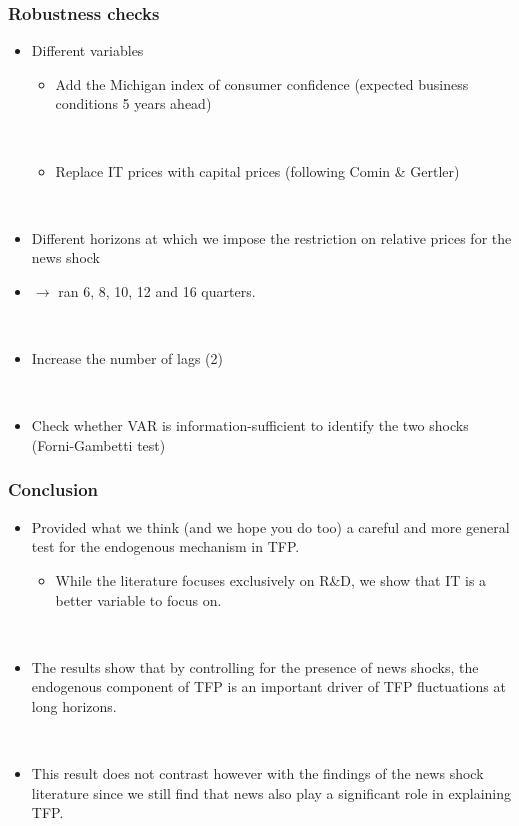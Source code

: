 \documentclass{beamer}
\begin{document}
\begin{frame}
	\frametitle{Robustness checks}

\begin{itemize}
\item Different variables
	\begin{itemize}
	\item Add the Michigan index of consumer confidence (expected business conditions 5 years ahead)
	
	
	\
	
	\item Replace IT prices with capital prices (following Comin \& Gertler)
	\end{itemize}
	
	\
	
\item Different horizons at which we impose the restriction on relative prices for the news shock
\item[] $\rightarrow$ ran  6, 8, 10, 12 and 16 quarters.

\

\item Increase the number of lags (2)

\

\item Check whether VAR is information-sufficient to identify the two shocks (Forni-Gambetti test)
\end{itemize}
   		 	
\end{frame}

\begin{frame}
	\frametitle{Conclusion}
	
\begin{itemize}
\item Provided what we think (and we hope you do too) a careful and more general test for the endogenous mechanism in TFP.
\begin{itemize}
\item While the literature focuses exclusively on R\&D, we show that IT is a better variable to focus on.
\end{itemize}

\ 

\item The results show that by controlling for the presence of news shocks, the endogenous component of TFP is an important driver of TFP fluctuations at long horizons.

\

\item This result does not contrast however with the findings of the news shock literature since we still find that news also play a significant role in explaining TFP.

\end{itemize}
   		 	
\end{frame}
\end{document}

